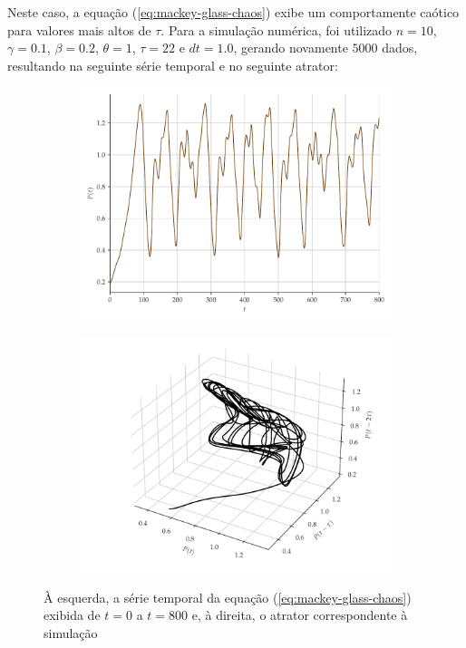 \documentclass[10pt, technote]{article}
\begin{document}
Neste caso, a equação (\ref{eq:mackey-glass-chaos}) exibe um comportamente caótico para valores mais altos de $\tau$. Para a simulação numérica, foi utilizado $n = 10$, $\gamma = 0.1$, $\beta = 0.2$, $\theta = 1$, $\tau = 22$ e $dt = 1.0$, gerando novamente $5000$ dados, resultando na seguinte série temporal e no seguinte atrator:
\begin{figure}[H]
     \centering
     \begin{subfigure}
         \centering
         \includegraphics[scale=0.24]{serie-mackeyglass.pdf}
     \end{subfigure}
     \begin{subfigure}
         \centering
         \includegraphics[scale=0.24]{atrator-mackeyglass.pdf}
     \end{subfigure}
     \caption{À esquerda, a série temporal da equação (\ref{eq:mackey-glass-chaos}) exibida de $t = 0 $ a $t = 800$ e, à direita, o atrator correspondente à simulação}
     \label{fig:mackey-glass}
\end{figure}
\end{document}
